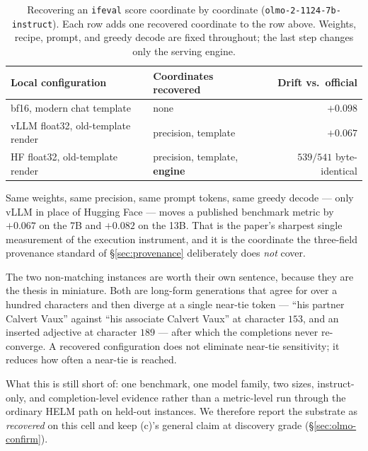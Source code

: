 \begin{table}[t]
\caption{Recovering an \texttt{ifeval} score coordinate by coordinate
(\texttt{olmo-2-1124-7b-instruct}). Each row adds one recovered coordinate to the
row above. Weights, recipe, prompt, and greedy decode are fixed throughout; the
last step changes only the serving engine.}
\label{tab:closure}
\begin{center}
\small
\begin{tabular}{llr}
\toprule
\textbf{Local configuration} & \textbf{Coordinates recovered} & \textbf{Drift vs.\ official} \\
\midrule
bf16, modern chat template          & none                            & $+0.098$ \\
vLLM float32, old-template render   & precision, template             & $+0.067$ \\
HF float32, old-template render     & precision, template, \textbf{engine} & $539/541$ byte-identical \\
\bottomrule
\end{tabular}
\end{center}
\end{table}

Same weights, same precision, same prompt tokens, same greedy decode --- only
vLLM in place of Hugging Face --- moves a published benchmark metric by
$+0.067$ on the 7B and $+0.082$ on the 13B. That is the paper's sharpest single
measurement of the execution instrument, and it is the coordinate the three-field
provenance standard of \S\ref{sec:provenance} deliberately does \emph{not} cover.

The two non-matching instances are worth their own sentence, because they are the
thesis in miniature. Both are long-form generations that agree for over a hundred
characters and then diverge at a single near-tie token --- ``his partner Calvert
Vaux'' against ``his associate Calvert Vaux'' at character $153$, and an inserted
adjective at character $189$ --- after which the completions never re-converge. A
recovered configuration does not eliminate near-tie sensitivity; it reduces how
often a near-tie is reached.

What this is still short of: one benchmark, one model family, two sizes,
instruct-only, and completion-level evidence rather than a metric-level run
through the ordinary HELM path on held-out instances. We therefore report the
substrate as \emph{recovered} on this cell and keep (c)'s general claim at
discovery grade (\S\ref{sec:olmo-confirm}).

